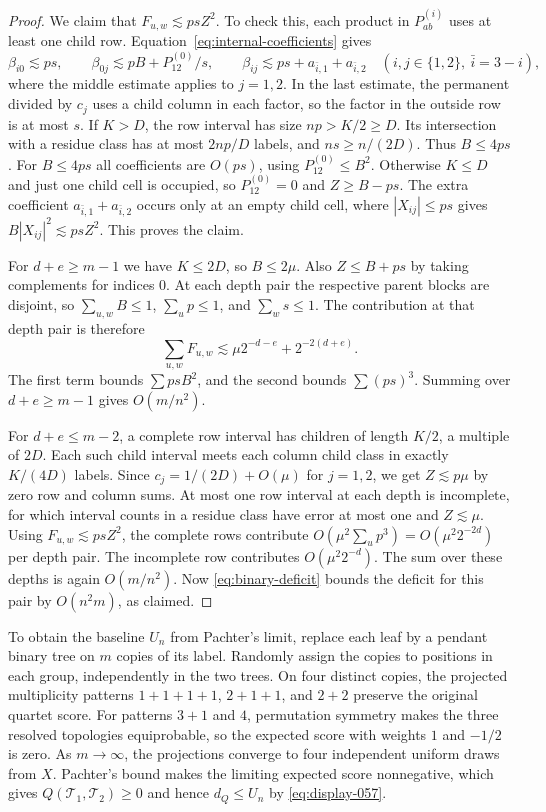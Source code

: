 \documentclass[12pt]{article}
\begin{document}
\begin{proof}
We claim that $F_{u,w}\lesssim ps Z^2$. To check this, each product
in $P^{(i)}_{ab}$ uses at least one child row.
Equation~\eqref{eq:internal-coefficients} gives
\[
 \beta_{i0}\lesssim ps,\qquad
 \beta_{0j}\lesssim pB+P^{(0)}_{12}/s,\qquad
 \beta_{ij}\lesssim ps+a_{\bar i,1}+a_{\bar i,2}
 \quad(i,j\in\{1,2\},\ \bar i=3-i),
\]
where the middle estimate applies to $j=1,2$. In the last estimate,
the permanent divided by $c_j$ uses a child column in each factor,
so the factor in the outside row is at most $s$. If $K>D$, the
row interval has size $np>K/2\ge D$. Its intersection with a
residue class has at most $2np/D$ labels, and $ns\ge n/(2D)$.
Thus $B\le4ps$. For $B\le4ps$ all coefficients are $O(ps)$,
using $P^{(0)}_{12}\le B^2$. Otherwise $K\le D$ and just one
child cell is occupied, so $P^{(0)}_{12}=0$ and $Z\ge B-ps$.
The extra coefficient $a_{\bar i,1}+a_{\bar i,2}$ occurs only at
an empty child cell, where $|X_{ij}|\le ps$ gives
$B|X_{ij}|^2\lesssim ps Z^2$. This proves the claim.

For $d+e\ge m-1$ we have $K\le2D$, so $B\le2\mu$.
Also $Z\le B+ps$ by taking complements for indices $0$.
At each depth pair the respective parent blocks are disjoint, so
$\sum_{u,w}B\le1$, $\sum_u p\le1$, and $\sum_w s\le1$.
The contribution at that depth pair is therefore
\[
 \sum_{u,w} F_{u,w}\lesssim
 \mu 2^{-d-e}+2^{-2(d+e)}.
\]
The first term bounds $\sum ps B^2$, and the second bounds
$\sum (ps)^3$. Summing over $d+e\ge m-1$ gives $O(m/n^2)$.

For $d+e\le m-2$, a complete row interval has children of
length $K/2$, a multiple of $2D$. Each such child interval meets
each column child class in exactly $K/(4D)$ labels.
Since $c_j=1/(2D)+O(\mu)$ for $j=1,2$, we get $Z\lesssim p\mu$
by zero row and column sums. At most one row interval at each
depth is incomplete, for which interval counts in a residue
class have error at most one and $Z\lesssim\mu$.
Using $F_{u,w}\lesssim psZ^2$, the complete rows contribute
$O(\mu^2\sum_u p^3)=O(\mu^2 2^{-2d})$ per depth pair.
The incomplete row contributes $O(\mu^2 2^{-d})$.
The sum over these depths is again $O(m/n^2)$.
Now \eqref{eq:binary-deficit} bounds the deficit for this pair
by $O(n^2m)$, as claimed.
\end{proof}

To obtain the baseline $U_n$ from Pachter's limit, replace each leaf
by a pendant binary tree on $m$ copies of its label. Randomly
assign the copies to positions in each group, independently in the
two trees. On four distinct copies, the projected multiplicity
patterns $1+1+1+1$, $2+1+1$, and $2+2$ preserve the original quartet
score. For patterns $3+1$ and $4$, permutation symmetry makes the
three resolved topologies equiprobable, so the expected score
with weights $1$ and $-1/2$ is zero. As $m\to\infty$, the
projections converge to four independent uniform draws from $X$.
Pachter's bound makes the limiting expected score nonnegative,
which gives $Q(\mathcal T_1,\mathcal T_2)\ge0$ and hence $d_Q\le U_n$
by \eqref{eq:display-057}.
\end{document}
